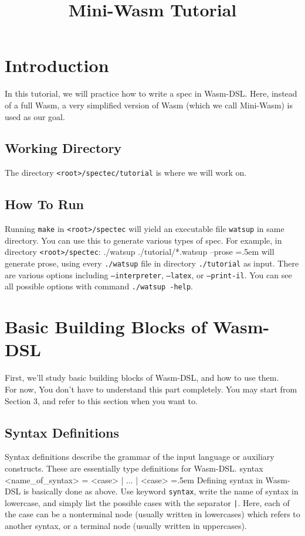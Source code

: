 \documentclass{article}
\date{}
\newenvironment{lcverbatim}
 {\SaveVerbatim{cverb}}
 {\endSaveVerbatim
  \flushleft\fboxrule=0pt\fboxsep=.5em
  \colorbox{cverbbg}{%
    \makebox[\dimexpr\linewidth-2\fboxsep][l]{\BUseVerbatim{cverb}}%
  }
  \endflushleft
}
\newcommand\K[1]{\texttt{#1}}
\begin{document}
\title{Mini-Wasm Tutorial}
\maketitle

\section{Introduction}
In this tutorial, we will practice how to write a spec in Wasm-DSL.
Here, instead of a full Wasm, a very simplified version of Wasm (which we call Mini-Wasm) is used as our goal.

\subsection{Working Directory}
The directory \K{<root>/spectec/tutorial} is where we will work on.

\subsection{How To Run}
Running \K{make} in \K{<root>/spectec} will yield an executable file \K{watsup} in same directory. You can use this to generate various types of spec. For example, in directory \K{<root>/spectec}:
\begin{lcverbatim}
./watsup ./tutorial/*.watsup --prose
\end{lcverbatim}
will generate prose, using every \K{./watsup} file in directory \K{./tutorial} as input. There are various options including \K{--interpreter}, \K{--latex}, or \K{--print-il}. You can see all possible options with command \K{./watsup -help}.

\section{Basic Building Blocks of Wasm-DSL}
First, we'll study basic building blocks of Wasm-DSL, and how to use them. \\
For now, You don't have to understand this part completely. You may start from Section 3, and refer to this section when you want to.

\subsection{Syntax Definitions}
Syntax definitions describe the grammar of the input language or auxiliary constructs. These are essentially type definitions for Wasm-DSL.
\begin{lcverbatim}
syntax <name_of_syntax> = <case> | ... | <case>
\end{lcverbatim}
Defining syntax in Wasm-DSL is basically done as above. Use keyword \K{syntax}, write the name of syntax in lowercase, and simply list the possible cases with the separator \K{|}. Here, each of the case can be a nonterminal node (usually written in lowercases) which refers to another syntax, or a terminal node (usually written in uppercases).
\end{document}
